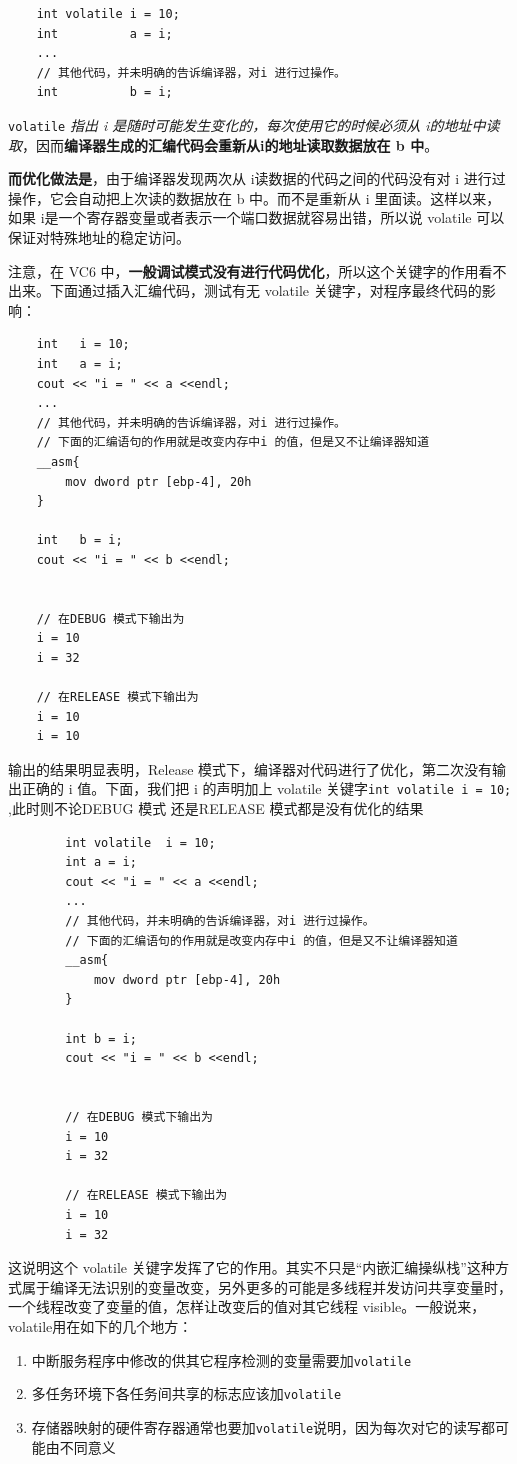 \documentclass[UTF8,a4paper,12pt]{ctexbook} %
\begin{document}
			\begin{lstlisting}
	int volatile i = 10;
	int 		 a = i;
	...
	// 其他代码，并未明确的告诉编译器，对i 进行过操作。
	int 		 b = i;
			\end{lstlisting}
		
			\verb|volatile| \textit{指出 i 是随时可能发生变化的，每次使用它的时候必须从 i的地址中读取}，因而\textbf{编译器生成的汇编代码}\textbf{会重新从i的地址读取数据放在 b 中}。
			
			\textbf{而优化做法是}，由于编译器发现两次从 i读数据的代码之间的代码没有对 i 进行过操作，它会自动把上次读的数据放在 b 中。而不是重新从 i 里面读。这样以来，如果 i是一个寄存器变量或者表示一个端口数据就容易出错，所以说 volatile 可以保证对特殊地址的稳定访问。
			
			注意，在 VC6 中，\textbf{一般调试模式没有进行代码优化}，所以这个关键字的作用看不出来。下面通过插入汇编代码，测试有无 volatile 关键字，对程序最终代码的影响：
			\begin{lstlisting}
	int   i = 10;
	int   a = i;
	cout << "i = " << a <<endl;
	...
	// 其他代码，并未明确的告诉编译器，对i 进行过操作。
	// 下面的汇编语句的作用就是改变内存中i 的值，但是又不让编译器知道
	__asm{
		mov dword ptr [ebp-4], 20h
	}
	
	int   b = i;
	cout << "i = " << b <<endl;
	
	
	// 在DEBUG 模式下输出为
	i = 10
	i = 32

	// 在RELEASE 模式下输出为
	i = 10
	i = 10
			\end{lstlisting}
		
			输出的结果明显表明，Release 模式下，编译器对代码进行了优化，第二次没有输出正确的 i 值。下面，我们把 i 的声明加上 volatile 关键字\verb|int volatile i = 10; |,此时则不论DEBUG 模式 还是RELEASE 模式都是没有优化的结果
				\begin{lstlisting}
		int volatile  i = 10;
		int a = i;
		cout << "i = " << a <<endl;
		...
		// 其他代码，并未明确的告诉编译器，对i 进行过操作。
		// 下面的汇编语句的作用就是改变内存中i 的值，但是又不让编译器知道
		__asm{
			mov dword ptr [ebp-4], 20h
		}
		
		int b = i;
		cout << "i = " << b <<endl;
		
		
		// 在DEBUG 模式下输出为
		i = 10
		i = 32
	
		// 在RELEASE 模式下输出为
		i = 10
		i = 32
				\end{lstlisting}
			
			这说明这个 volatile 关键字发挥了它的作用。其实不只是“内嵌汇编操纵栈”这种方式属于编译无法识别的变量改变，另外更多的可能是多线程并发访问共享变量时，一个线程改变了变量的值，怎样让改变后的值对其它线程 visible。一般说来，volatile用在如下的几个地方： 
				\begin{enumerate}
					\item 中断服务程序中修改的供其它程序检测的变量需要加\verb|volatile|
					\item 多任务环境下各任务间共享的标志应该加\verb|volatile| 
					\item 存储器映射的硬件寄存器通常也要加\verb|volatile|说明，因为每次对它的读写都可能由不同意义
				\end{enumerate}
\end{document}
